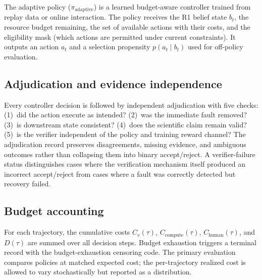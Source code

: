 The adaptive policy ($\pi_{\text{adaptive}}$) is a learned budget-aware
controller trained from replay data or online interaction. The policy
receives the R1 belief state $b_t$, the resource budget remaining, the
set of available actions with their costs, and the eligibility mask (which
actions are permitted under current constraints). It outputs an action
$a_t$ and a selection propensity $p(a_t \mid b_t)$ used for off-policy
evaluation.

\subsection{Adjudication and evidence independence}

Every controller decision is followed by independent adjudication with five
checks: (1)~did the action execute as intended? (2)~was the immediate fault
removed? (3)~is downstream state consistent? (4)~does the scientific claim
remain valid? (5)~is the verifier independent of the policy and training
reward channel? The adjudication record preserves disagreements, missing
evidence, and ambiguous outcomes rather than collapsing them into binary
accept/reject. A verifier-failure status distinguishes cases where the
verification mechanism itself produced an incorrect accept/reject from cases
where a fault was correctly detected but recovery failed.

\subsection{Budget accounting}

For each trajectory, the cumulative costs $C_v(\tau)$,
$C_{\text{compute}}(\tau)$, $C_{\text{human}}(\tau)$, and $D(\tau)$ are
summed over all decision steps. Budget exhaustion triggers a terminal
record with the budget-exhaustion censoring code. The primary evaluation
compares policies at matched expected cost; the per-trajectory realized
cost is allowed to vary stochastically but reported as a distribution.
